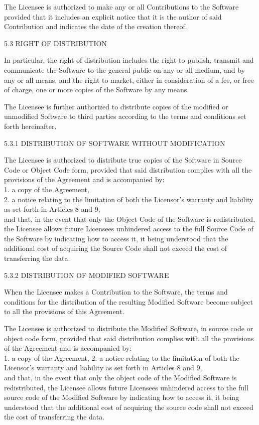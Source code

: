 The Licensee is authorized to make any or all Contributions to the Software provided that it includes an explicit notice that it is the author of said Contribution and indicates the date of the creation thereof.

5.3 RIGHT OF DISTRIBUTION

In particular, the right of distribution includes the right to publish, transmit and communicate the Software to the general public on any or all medium, and by any or all means, and the right to market, either in consideration of a fee, or free of charge, one or more copies of the Software by any means.

The Licensee is further authorized to distribute copies of the modified or unmodified Software to third parties according to the terms and conditions set forth hereinafter.

5.3.1 DISTRIBUTION OF SOFTWARE WITHOUT MODIFICATION

The Licensee is authorized to distribute true copies of the Software in Source Code or Object Code form, provided that said distribution complies with all the provisions of the Agreement and is accompanied by:\\
1. a copy of the Agreement,\\
2. a notice relating to the limitation of both the Licensor's warranty and liability as set forth in Articles 8 and 9,\\
and that, in the event that only the Object Code of the Software is redistributed, the Licensee allows future Licensees unhindered access to the full Source Code of the Software by indicating how to access it, it being understood that the additional cost of acquiring the Source Code shall not exceed the cost of transferring the data.

5.3.2 DISTRIBUTION OF MODIFIED SOFTWARE

When the Licensee makes a Contribution to the Software, the terms and conditions for the distribution of the resulting Modified Software become subject to all the provisions of this Agreement.

The Licensee is authorized to distribute the Modified Software, in source code or object code form, provided that said distribution complies with all the provisions of the Agreement and is accompanied by: \\
1. a copy of the Agreement,
2. a notice relating to the limitation of both the Licensor's warranty and liability as set forth in Articles 8 and 9, \\
and that, in the event that only the object code of the Modified Software is redistributed, the Licensee allows future Licensees unhindered access to the full source code of the Modified Software by indicating how to access it, it being understood that the additional cost of acquiring the source code shall not exceed the cost of transferring the data.


